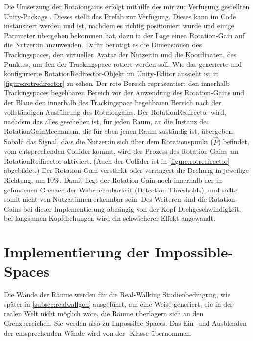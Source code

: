 Die Umsetzung der Rotaiongains erfolgt mithilfe des mir zur Verfügung gestellten Unity-Package  \cite{space-extender-git}.
Dieses stellt das Prefab  zur Verfügung. Dieses kann im Code instanziiert werden und ist, nachdem es richtig positioniert wurde und einige Parameter übergeben bekommen hat, dazu in der Lage einen Rotation-Gain auf die Nutzer:in anzuwenden. Dafür benötigt es die Dimensionen des Trackingspaces, den virtuellen Avatar der Nutzer:in und die Koordinaten, des Punktes, um den der Trackingspace rotiert werden soll.
Wie das generierte und konfigurierte RotationRedirector-Objekt im Unity-Editor aussieht ist in \autoref{figure:rotredirector} zu sehen. Der rote Bereich repräsentiert den innerhalb Trackingspaces begehbaren Bereich vor der Anwendung des Rotation-Gains und der Blaue den innerhalb des Trackingspace begehbaren Bereich nach der vollständigen Ausführung des Rotaiongains.
Der RotationRedirector wird, nachdem das alles geschehen ist, für jeden Raum, an die Instanz des RotationGainMechanism, die für eben jenen Raum zuständig ist, übergeben. Sobald das Signal, dass die Nutzer:in sich über dem Rotationspunkt ($\vec{P}$) befindet, vom entsprechenden Collider kommt, wird der Prozess des Rotation-Gains am RotationRedirector aktiviert. (Auch der Collider ist in \autoref{figure:rotredirector} abgebildet.)
Der Rotation-Gain verstärkt oder verringert die Drehung in jeweilige Richtung, um $10\%$. Damit liegt der Rotation-Gain noch innerhalb der in \cite{detection-thresholds} gefundenen Grenzen der Wahrnehmbarkeit (Detection-Thresholds), und sollte somit nicht von Nutzer:innen erkennbar sein.
Des Weiteren sind die Rotation-Gains bei dieser Implementierung abhängig von der Kopf-Drehgeschwindigkeit, bei langsamen Kopfdrehungen wird ein schwächerer Effekt angewandt.

\section{Implementierung der Impossible-Spaces}
Die Wände der Räume werden für die Real-Walking Studienbedingung, wie später in \autoref{subsec:realwallgen} ausgeführt, auf eine Weise generiert, die in der realen Welt nicht möglich wäre, die Räume überlagern sich an den Grenzbereichen. Sie werden also zu Impossible-Spaces. Das Ein- und Ausblenden der entsprechenden Wände wird von der -Klasse übernommen.

